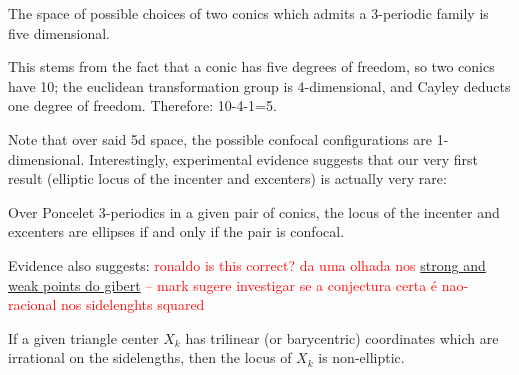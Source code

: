 \begin{remark}
The space of possible choices of two conics which admits a 3-periodic family is five dimensional.
\end{remark}

This stems from the fact that a conic has five degrees of freedom, so two conics have 10; the euclidean transformation group is 4-dimensional, and Cayley deducts one degree of freedom. Therefore: 10-4-1=5.

Note that over said 5d space, the possible confocal configurations are 1-dimensional. Interestingly, experimental evidence suggests that our very first result (elliptic locus of the incenter and excenters) is actually very rare:

\begin{conjecture}
Over Poncelet 3-periodics in a given pair of conics, the locus of the incenter and excenters are ellipses if and only if the pair is confocal.
\label{conj:07-incenter-excenter-loci}
\end{conjecture}

Evidence also suggests:
\textcolor{red}{ronaldo is this correct? da uma olhada nos \href{https://bernard-gibert.pagesperso-orange.fr/Tables/table28.html}{strong and weak points do gibert} -- mark sugere investigar se a conjectura certa é nao-racional nos sidelenghts squared}

\begin{conjecture}
If a given triangle center $X_k$ has trilinear (or barycentric) coordinates which are irrational on the sidelengths, then the locus of $X_k$ is non-elliptic.
\end{conjecture}
